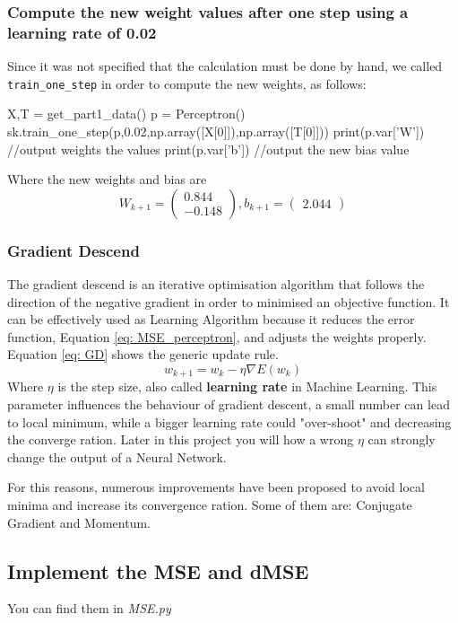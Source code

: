 \documentclass[11pt]{article}
\begin{document}
\subsubsection{Compute the new weight values after one step using a learning rate of 0.02}
Since it was not specified that the calculation must be done by hand, we called \texttt{train\_one\_step} in order to compute the new weights, as follows:
\begin{python}
X,T = get_part1_data()
p = Perceptron()
sk.train_one_step(p,0.02,np.array([X[0]]),np.array([T[0]]))
print(p.var['W']) //output weights the values	
print(p.var['b']) //output the new bias value
\end{python}
Where the new weights and bias are
$$W_{k + 1} = \begin{pmatrix}
 0.844 \\
 -0.148
\end{pmatrix}, b_{k+1} = \begin{pmatrix}
	2.044
\end{pmatrix}$$
\subsubsection{Gradient Descend}
The gradient descend is an iterative optimisation algorithm that follows the direction of the negative gradient in order to minimised an objective function. It can be effectively used as Learning Algorithm because it reduces the error function, Equation \ref{eq: MSE_perceptron}, and adjusts the weights properly. Equation \ref{eq: GD} shows the generic update rule.
\begin{equation}
\label{eq: GD}
	w_{k + 1} = w_k - \eta \nabla E(w_k)
\end{equation}
Where $\eta$ is the step size, also called \textbf{learning rate} in Machine Learning. This parameter influences the behaviour of gradient descent, a small number can lead to local minimum, while a bigger learning rate could "over-shoot" and decreasing the converge ration. Later in this project you will how a wrong $\eta$ can strongly change the output of a Neural Network.

For this reasons, numerous improvements have been proposed to avoid local minima and increase its convergence ration. Some of them are: Conjugate Gradient and Momentum.
\subsection{Implement the MSE and dMSE}
You can find them in \emph{MSE.py}
\end{document}
